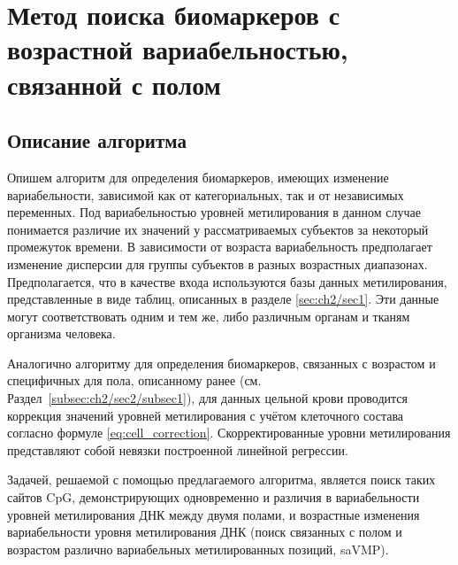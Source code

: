 \section{Метод поиска биомаркеров с возрастной вариабельностью, связанной с полом}\label{sec:ch2/sec3}

\subsection{Описание алгоритма}\label{subsec:ch2/sec3/subsec1}

Опишем алгоритм для определения биомаркеров, имеющих изменение вариабельности, зависимой как от категориальных, так и от независимых переменных. Под вариабельностью уровней метилирования в данном случае понимается различие их значений у рассматриваемых субъектов за некоторый промежуток времени. В зависимости от возраста вариабельность предполагает изменение дисперсии для группы субъектов в разных возрастных диапазонах. Предполагается, что в качестве входа используются базы данных метилирования, представленные в виде таблиц, описанных в разделе \ref{sec:ch2/sec1}. Эти данные могут соответствовать одним и тем же, либо различным органам и тканям организма человека. 

Аналогично алгоритму для определения биомаркеров, связанных с возрастом и специфичных для пола, описанному ранее (см. Раздел~\ref{subsec:ch2/sec2/subsec1}), для данных цельной крови проводится коррекция значений уровней метилирования с учётом клеточного состава согласно формуле \ref{eq:cell_correction}. Скорректированные уровни метилирования представляют собой невязки построенной линейной регрессии.

Задачей, решаемой с помощью предлагаемого алгоритма, является поиск таких сайтов CpG, демонстрирующих одновременно и различия в вариабельности уровней метилирования ДНК между двумя полами, и возрастные изменения вариабельности уровня метилирования ДНК (поиск связанных с полом и возрастом различно вариабельных метилированных позиций, saVMP).


